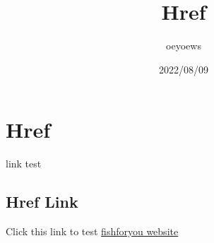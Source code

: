 \documentclass{article}
\title{Href}
\author{oeyoews}
\date{2022/08/09}
\begin{document}
\maketitle

\section*{Href}

link test

\subsection{Href Link}%

Click this link to test
\href{https://oeyoew.fun}{fishforyou website}
\end{document}
